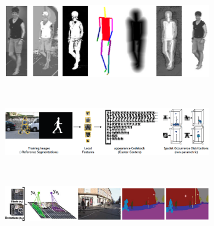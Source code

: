 \documentclass[10pt,twocolumn,letterpaper]{article}
\begin{document}
\begin{figure}
\begin{subfigure}[b]{0.45\textwidth}
		\caption{}
    		\label{fig:soa_grabcut}
 	\end{subfigure}
	~
	\begin{subfigure}[b]{0.49\textwidth}
 		\includegraphics[width=1\textwidth]{pictures/stateoftheart/bray2006posecut.eps} 			
		\caption{}
    		\label{fig:soa_posecut}
 	\end{subfigure}
	\\
 	\begin{subfigure}[b]{1\textwidth}
 		\includegraphics[width=1\textwidth]{pictures/stateoftheart/leibe2008robust.eps}
 		\caption{}
    		\label{fig:soa_ism}
 	\end{subfigure}
 	\\
  	\begin{subfigure}[b]{1\textwidth}
		\includegraphics[width=1\textwidth]{pictures/stateoftheart/ladicky2010and.eps}
 		\caption{}
         	\label{fig:soa_crf}
 	\end{subfigure}

\end{figure}
\end{document}
